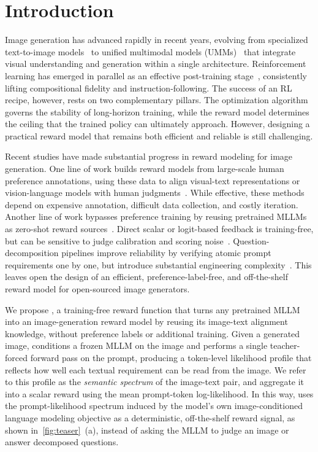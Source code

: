 \section{Introduction}
\label{sec:intro}

Image generation has advanced rapidly in recent years, evolving from
specialized text-to-image models~\cite{sd3,flux} to unified multimodal
models (UMMs)~\cite{bagel,chameleon,januspro,emu3,emu3.5,illume+,metaquery}
that integrate visual understanding and generation within a single
architecture. Reinforcement learning has emerged in parallel as an
effective post-training stage~\cite{flowgrpo,dancegrpo,awm,diffusionnft},
consistently lifting compositional fidelity and instruction-following. The success of an RL recipe, however, rests on two
complementary pillars. 
The optimization algorithm governs the stability of long-horizon training,
while the reward model determines the ceiling that the trained policy can
ultimately approach. 
However, designing a practical reward model that remains both efficient and reliable is still challenging.


Recent studies have made substantial progress in reward modeling for image generation.
One line of work builds reward models from large-scale
human preference annotations, using these data to align visual-text
representations or vision-language models with human judgments~\cite{pickscore,imagereward,hpsv2,rewarddance,unifiedreward}. While effective, these methods depend on expensive annotation, difficult data collection, and costly iteration. Another line of work bypasses preference training by reusing pretrained MLLMs as zero-shot reward sources~\cite{viescore,li2025uniworld,alphagrpo}. Direct scalar or logit-based feedback is training-free, but can be sensitive to judge calibration and scoring noise~\cite{viescore,li2025uniworld}. Question-decomposition pipelines improve reliability by verifying atomic prompt requirements one by one, but introduce substantial engineering complexity~\cite{alphagrpo}. This leaves open the design of an efficient, preference-label-free, and off-the-shelf reward model for open-sourced image generators.


We propose \method, a training-free reward function that turns any
pretrained MLLM into an image-generation reward model by reusing its
image-text alignment knowledge, without preference labels or additional training. 
Given a generated image, \method conditions a frozen MLLM on the image and performs a single teacher-forced forward pass on the prompt, 
producing a token-level likelihood profile that reflects how well each textual requirement can be read from the image. 
We refer to this profile as the \emph{semantic spectrum} of the image-text pair, 
and aggregate it into a scalar reward using the mean prompt-token log-likelihood. 
In this way, \method uses the prompt-likelihood spectrum induced by the model's own image-conditioned language modeling objective as a deterministic, off-the-shelf reward signal, as shown in~\autoref{fig:teaser}~(a), instead of asking the MLLM to judge an image or answer decomposed questions.


